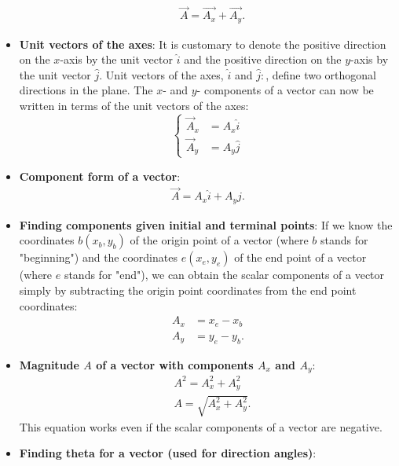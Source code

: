 \documentclass{report}
\begin{document}
\begin{itemize}
            \begin{align*}
                &\vec{A} = \vec{A_{x}} + \vec{A_{y}}
            .\end{align*}
        \item \textbf{Unit vectors of the axes}:     It is customary to denote the positive direction on the $x$-axis by the unit vector $\hat{i}$ and the positive direction on the $y$-axis by the unit vector $\hat{j}$. Unit vectors of the axes, $\hat{i}$ and $\hat{j}:$, define two orthogonal directions in the plane. The $x$- and $y$- components of a vector can now be written in terms of the unit vectors of the axes:
            \bigbreak \noindent 
               \begin{equation}
                    \begin{cases}
                        \vec{A}_{x} &= A_{x}\hat{i}  \\
                         \vec{A}_{y} &= A_{y}\hat{j}  
                    \end{cases}
                \end{equation}
        \item \textbf{Component form of a vector}:
            \begin{align*}
                \vec{A} = A_{x}\hat{i} + A_{y}\hat{j}
            .\end{align*}
        \item \textbf{Finding components given initial and terminal points}: If we know the coordinates $b(x_b, y_b)$ of the origin point of a vector (where $b$ stands for "beginning") and the coordinates $e(x_e, y_e)$ of the end point of a vector (where $e$ stands for "end"), we can obtain the scalar components of a vector simply by subtracting the origin point coordinates from the end point coordinates:
            \begin{align*}
                A_x &= x_e - x_b  \\
                A_y &= y_e - y_b
            .\end{align*}
        \item \textbf{Magnitude $A$ of a vector with components $A_{x}$ and $A_{y}$}:
            \begin{align*}
               &A^{2}  = A_{x}^{2} + A_{y}^{2} \\
               &A = \sqrt{A_{x}^{2} + A_{y}^{2}}
            .\end{align*}
            This equation works even if the scalar components of a vector are negative.
        \item \textbf{Finding theta for a vector (used for direction angles)}:

\end{itemize}
\end{document}
